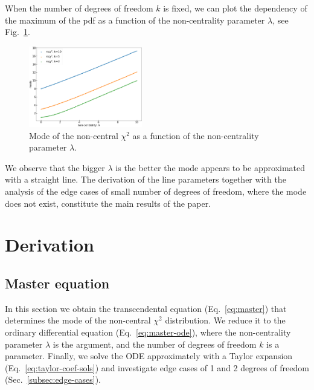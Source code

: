 \documentclass[final,5p,twocolumn,preprint,nopreprintline,times,authoryear]{elsarticle}
\begin{document}
When the number of degrees of freedom $k$ is fixed, we can plot the dependency of the maximum of the pdf as a function of the non-centrality parameter $\lambda$, see Fig.~\ref{fig:ncx2-max}.

\begin{figure}[h]
	\centering
 	\includegraphics[width=0.44\textwidth]{ncx2-max.png}
	\caption{Mode of the non-central $\chi^2$ as a function of the non-centrality parameter $\lambda$.}\label{fig:ncx2-max}
\end{figure}

We observe that the bigger $\lambda$ is the better the mode appears to be approximated with a straight line. The derivation of the line parameters together with the analysis of the edge cases of small number of degrees of freedom, where the mode does not exist, constitute the main results of the paper.

\section{Derivation}

\subsection{Master equation}
In this section we obtain the transcendental equation (Eq.~\ref{eq:master}) that determines the mode of the non-central $\chi^2$ distribution. We reduce it to the ordinary differential equation (Eq.~\ref{eq:master-ode}), where the non-centrality parameter $\lambda$ is the argument, and the number of degrees of freedom $k$ is a parameter. Finally, we solve the ODE approximately with a Taylor expansion (Eq.~\ref{eq:taylor-coef-sols}) and investigate edge cases of 1 and 2 degrees of freedom (Sec.~\ref{subsec:edge-cases}).
\end{document}
